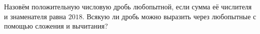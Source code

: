 Назовём положительную числовую дробь любопытной, если сумма её числителя и знаменателя равна $2018$. Всякую ли дробь можно выразить через любопытные с помощью сложения и вычитания?
